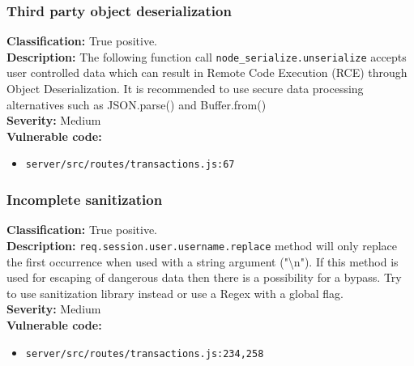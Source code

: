 \documentclass[]{article}
\begin{document}
\subsubsection{Third party object deserialization}
\textbf{Classification:} {True positive.} \\
\textbf{Description:} The following function call \texttt{node\_serialize.unserialize} accepts user controlled data which can result in Remote Code Execution (RCE) through Object Deserialization. It is recommended to use secure data processing alternatives such as JSON.parse() and Buffer.from() \\ 
\textbf{Severity:} Medium \\ 
\textbf{Vulnerable code:}
\begin{itemize}
    \item \texttt{server/src/routes/transactions.js:67}
\end{itemize}

\subsubsection{Incomplete sanitization}
\textbf{Classification:} {True positive.} \\
\textbf{Description:} \texttt{req.session.user.username.replace} method will only replace the first occurrence when used with a  
          string argument ("\textbackslash n"). If this method is used for escaping of dangerous data then there is a       
          possibility for a bypass. Try to use sanitization library instead or use a Regex with a global flag. \\ 
\textbf{Severity:} Medium \\ 
\textbf{Vulnerable code:}
\begin{itemize}
    \item \texttt{server/src/routes/transactions.js:234,258}
\end{itemize}
\end{document}

